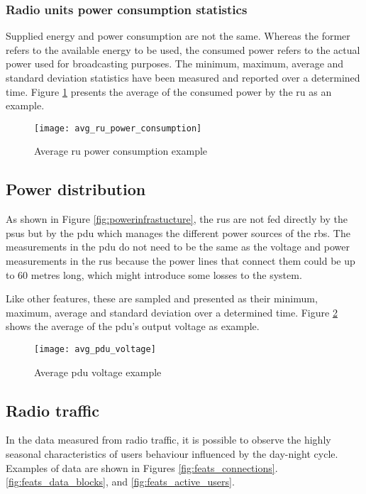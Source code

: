 \subsubsection*{Radio units power consumption statistics}

Supplied energy and power consumption are not the same. Whereas the former refers to the available energy to be used, the consumed power refers to the actual power used for broadcasting purposes. The minimum, maximum, average and standard deviation statistics have been measured and reported over a determined time. Figure \ref{fig:feats_avg_ru_power_consumption} presents the average of the consumed power by the \ac{ru} as an example.

\begin{figure}[hptb]
	\centering
	\texttt{[image: avg\_ru\_power\_consumption]}
	\caption{Average \ac{ru} power consumption example}
	\label{fig:feats_avg_ru_power_consumption}
\end{figure}

\subsection{Power distribution}

As shown in Figure \ref{fig:powerinfrastucture}, the \acp{ru} are not fed directly by the \acp{psu} but by the \ac{pdu} which manages the different power sources of the \ac{rbs}. The measurements in the \ac{pdu} do not need to be the same as the voltage and power measurements in the \acp{ru} because the power lines that connect them could be up to 60 metres long, which might introduce some losses to the system.

Like other features, these are sampled and presented as their minimum, maximum, average and standard deviation over a determined time. Figure \ref{fig:feats_avg_pdu_voltage} shows the average of the \ac{pdu}'s output voltage as example.

\begin{figure}[hptb]
	\centering
	\texttt{[image: avg\_pdu\_voltage]}
	\caption{Average \ac{pdu} voltage example}
	\label{fig:feats_avg_pdu_voltage}
\end{figure}


\subsection{Radio traffic}

In the data measured from radio traffic, it is possible to observe the highly seasonal characteristics of users behaviour influenced by the day-night cycle. Examples of data are shown in Figures \ref{fig:feats_connections}. \ref{fig:feats_data_blocks}, and \ref{fig:feats_active_users}. 

